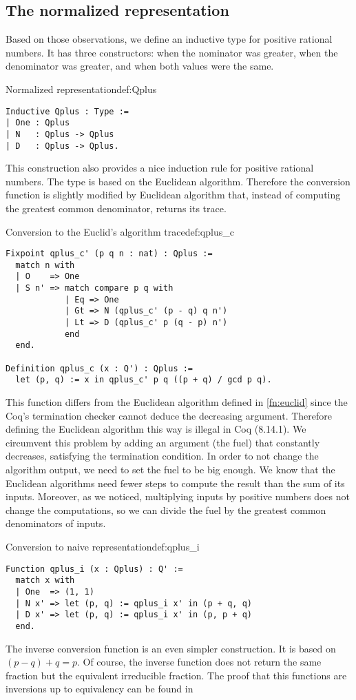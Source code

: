 \subsection{The normalized representation}
Based on those observations, we define an inductive type for positive rational numbers. It has three constructors:  when the nominator was greater,  when the denominator was greater, and  when both values were the same.
\begin{defi}{Normalized representation}{def:Qplus}
\begin{verbatim}
Inductive Qplus : Type :=
| One : Qplus
| N   : Qplus -> Qplus
| D   : Qplus -> Qplus.
\end{verbatim}
\end{defi}
This construction also provides a nice induction rule for positive rational numbers. The type  is based on the Euclidean algorithm. Therefore the conversion function is slightly modified by Euclidean algorithm that, instead of computing the greatest common denominator, returns its trace. 
\begin{func}{Conversion to the Euclid's algorithm trace}{def:qplus_c}
\begin{verbatim}
Fixpoint qplus_c' (p q n : nat) : Qplus :=
  match n with
  | O    => One
  | S n' => match compare p q with
            | Eq => One
            | Gt => N (qplus_c' (p - q) q n')
            | Lt => D (qplus_c' p (q - p) n')
            end
  end.

Definition qplus_c (x : Q') : Qplus :=
  let (p, q) := x in qplus_c' p q ((p + q) / gcd p q).
\end{verbatim}
\end{func}
This function differs from the Euclidean algorithm defined in \ref{fn:euclid} since the Coq's termination checker cannot deduce the decreasing argument. Therefore defining the Euclidean algorithm this way is illegal in Coq (8.14.1). We circumvent this problem by adding an argument (the fuel) that constantly decreases, satisfying the termination condition. In order to not change the algorithm output, we need to set the fuel to be big enough. We know that the Euclidean algorithms need fewer steps to compute the result than the sum of its inputs. Moreover, as we noticed, multiplying inputs by positive numbers does not change the computations, so we can divide the fuel by the greatest common denominators of inputs.
\begin{func}{Conversion to naive representation}{def:qplus_i}
\begin{verbatim}
Function qplus_i (x : Qplus) : Q' :=
  match x with
  | One  => (1, 1)
  | N x' => let (p, q) := qplus_i x' in (p + q, q)
  | D x' => let (p, q) := qplus_i x' in (p, p + q)
  end.
\end{verbatim}
\end{func}
The inverse conversion function is an even simpler construction. It is based on $(p - q) + q = p$. Of course, the inverse function does not return the same fraction but the equivalent irreducible fraction. The proof that this functions are inversions up to equivalency can be found in 
